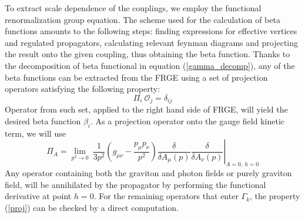 \documentclass[11pt, a4paper]{article}
\begin{document}
To extract scale dependence of the couplings, we employ the functional renormalization group equation.
The scheme used for the calculation of beta functions amounts to the following steps: finding expressions for effective vertices and
regulated propagators, calculating relevant feynman diagrams and projecting the result onto the given coupling, thus obtaining the beta function.
Thanks to the decomposition of beta functional in equation (\ref{gamma_decomp}), any of the beta functions can be extracted
from the FRGE using a set of projection operators satisfying the following property:
\begin{equation}
    \varPi_i \ \mathcal{O}_j = \delta_{ij}
    \label{proj}
\end{equation}
Operator from such set, applied to the right hand side of FRGE, will yield the desired beta function $\beta_i$.
As a projection operator onto the gauge field kinetic term, we will use
\begin{equation}
    \varPi_A = \left. \lim_{p^2 \rightarrow 0} \ \frac{1}{3 p^2} \left( g_{\mu\nu} - \frac{p_\mu p_\nu}{p^2} \right) \frac{\delta}{\delta A_\mu(p)} \frac{\delta}{\delta A_\nu(p)} \right|_{A=0, \ h=0}
    \label{projA}
\end{equation}
Any operator containing both the graviton and photon fields or purely graviton field, will be annihilated
by the propagator by performing the functional derivative at point $h=0$. For the remaining operators that enter $\Gamma_k$,
the property (\ref{proj}) can be checked by a direct computation.
\end{document}
